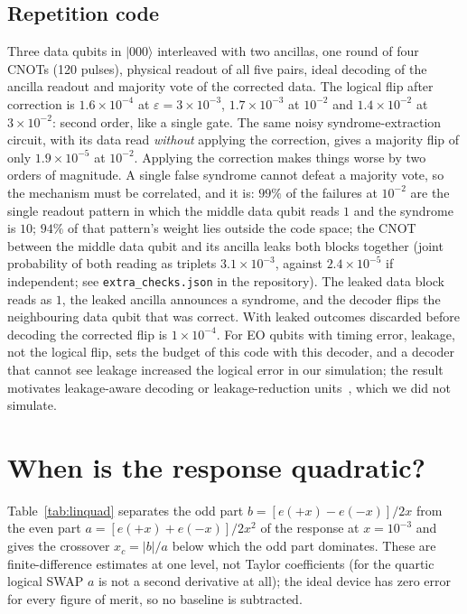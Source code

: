 \documentclass[reprint,aps,pra,amsmath,amssymb,superscriptaddress,letterpaper]{revtex4-2}
\newcommand{\ket}[1]{\lvert #1\rangle}
\begin{document}
\subsection{Repetition code}

Three data qubits in $\ket{000}$ interleaved with two ancillas, one round of
four CNOTs (120 pulses), physical readout of all five pairs, ideal decoding of
the ancilla readout and majority vote of the corrected data. The logical flip
after correction is $1.6\times10^{-4}$ at $\varepsilon=3\times10^{-3}$,
$1.7\times10^{-3}$ at $10^{-2}$ and $1.4\times10^{-2}$ at $3\times10^{-2}$:
second order, like a single gate. The same noisy syndrome-extraction circuit, with its data read \emph{without} applying the correction, gives a majority flip of only $1.9\times10^{-5}$ at $10^{-2}$. Applying the correction makes things worse by two orders of magnitude. A single false
syndrome cannot defeat a majority vote, so the mechanism must be correlated,
and it is: $99\%$ of the failures at $10^{-2}$ are the single readout pattern in which the middle data qubit reads $1$ and the syndrome is $10$; $94\%$ of that pattern's weight lies outside the code space; the CNOT between the middle data qubit and its ancilla leaks both blocks together (joint probability of both reading as triplets $3.1\times10^{-3}$, against $2.4\times10^{-5}$ if independent; see \texttt{extra\_checks.json} in the repository). The leaked data block reads as $1$, the leaked ancilla announces
a syndrome, and the decoder flips the neighbouring data qubit that was
correct. With leaked outcomes discarded before decoding the corrected flip is
$1\times10^{-4}$. For EO qubits with timing error, leakage, not the logical flip, sets the budget of this code with this decoder, and a decoder that cannot see leakage increased the logical error in our simulation; the result motivates leakage-aware decoding or leakage-reduction units~\cite{fong2011}, which we did not simulate.

\section{When is the response quadratic?}
\label{sec:order}

Table~\ref{tab:linquad} separates the odd part $b=[e(+x)-e(-x)]/2x$ from the
even part $a=[e(+x)+e(-x)]/2x^2$ of the response at $x=10^{-3}$ and gives the
crossover $x_c=|b|/a$ below which the odd part dominates. These are
finite-difference estimates at one level, not Taylor coefficients (for the
quartic logical SWAP $a$ is not a second derivative at all); the ideal device
has zero error for every figure of merit, so no baseline is subtracted.
\end{document}
